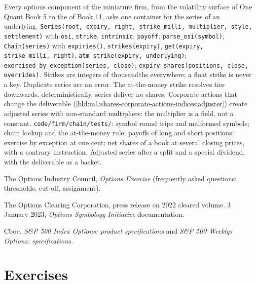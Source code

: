 \begin{build}
 Every options component of the miniature firm, from the
volatility surface of One Quant Book 5 to the  of Book 11, asks
one container for the series of an underlying.
 \texttt{Series(root, expiry, right, strike\_milli,
multiplier, style, settlement)} with \texttt{osi}, \texttt{strike},
\texttt{intrinsic}, \texttt{payoff}; \texttt{parse\_osi(symbol)};
\texttt{Chain(series)} with \texttt{expiries()}, \texttt{strikes(expiry)},
\texttt{get(expiry, strike\_milli, right)}, \texttt{atm\_strike(expiry,
underlying)}; \texttt{exercised\_by\_exception(series, close)};
\texttt{expiry\_shares(positions, close, overrides)}.
 Strikes are integers of thousandths everywhere; a float
strike is never a key. Duplicate series are an error. The at-the-money
strike resolves ties downwards, deterministically.  series
deliver no shares. Corporate actions that change the deliverable
(\cref{bld:m1:shares-corporate-actions-indices:adjuster}) create adjusted
series with non-standard multipliers: the multiplier is a field, not a
constant.
 \texttt{code/firm/chain/tests/}: symbol round
trips and malformed symbols; chain lookup and the at-the-money rule; payoffs
of long and short positions; exercise by exception at one cent; net shares
of a book at several closing prices, with a contrary instruction.
 Adjusted series after a split and a special dividend, with
the deliverable as a basket.
\end{build}

\begin{omsources}
\item The Options Industry Council, \emph{Options Exercise} (frequently asked
questions: thresholds, cut-off, assignment).
\item The Options Clearing Corporation, press release on 2022 cleared
volume, 3 January 2023; \emph{Options Symbology Initiative} documentation.
\item Cboe, \emph{S\&P 500 Index Options: product specifications} and
\emph{S\&P 500 Weeklys Options: specifications}.
\end{omsources}

\section{Exercises}

